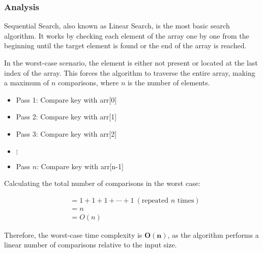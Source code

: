 \subsubsection{Analysis}

Sequential Search, also known as Linear Search, is the most basic search algorithm. It works by checking each element of the array one by one from the beginning until the target element is found or the end of the array is reached.

In the worst-case scenario, the element is either not present or located at the last index of the array. This forces the algorithm to traverse the entire array, making a maximum of \(n\) comparisons, where \(n\) is the number of elements.

\begin{itemize}
    \item Pass 1: Compare key with arr[0]
    \item Pass 2: Compare key with arr[1]
    \item Pass 3: Compare key with arr[2]
    \item[] \(\vdots\)
    \item Pass \(n\): Compare key with arr[n-1]
\end{itemize}

Calculating the total number of comparisons in the worst case:
\begin{center}
    \begin{align*}
        &= 1 + 1 + 1 + \cdots + 1\ (\text{repeated \(n\) times}) \\
        &= n \\
        &= \textbf{\(O(n)\)}
    \end{align*}
\end{center}

Therefore, the worst-case time complexity is \(\mathbf{O(n)}\), as the algorithm performs a linear number of comparisons relative to the input size.
